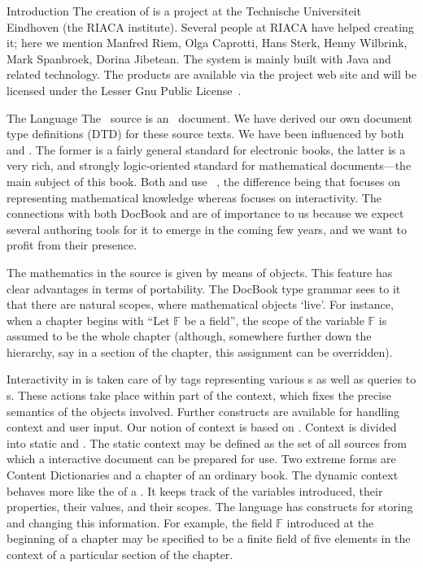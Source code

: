 \begin{omgroup}[id=mathdox2,short=MathDox,creators={amc,cuypers,barreiro}]
\begin{omgroup}{Introduction}
The creation of {\MathDox} is a project at the Technische Universiteit Eindhoven (the
RIACA institute).  Several people at RIACA have helped creating it; here we mention
Manfred Riem, Olga Caprotti, Hans Sterk, Henny Wilbrink, Mark Spanbroek, Dorina Jibetean.
The system is mainly built with Java and related technology.  The products are available
via the project web site and will be licensed under the Lesser Gnu Public
License~\cite{LGPL}.
\end{omgroup}

\begin{omgroup}[id=mathdox.ui]{The Language}
The \MathDox\ source is an \xml\ document.  We have derived our own document type
definitions (DTD) for these source texts.  We have been influenced by both
{\docbook}~\cite{WalMue:dtdg99} and {\omdoc}. The former is a fairly general standard for
electronic books, the latter is a very rich, and strongly logic-oriented standard for
mathematical documents---the main subject of this book.  Both {\omdoc} and {\MathDox} use
{\openmath}~\cite{BusCapCar:2oms04}, the difference being that {\omdoc} focuses on
representing mathematical knowledge whereas {\MathDox} focuses on interactivity.  The
connections with both DocBook and {\omdoc} are of importance to us because we expect
several authoring tools for it to emerge in the coming few years, and we want to profit
from their presence.

The mathematics in the {\MathDox} source is given by means of {\openmath} objects.  This
feature has clear advantages in terms of portability. The DocBook type grammar sees to it
that there are natural scopes, where mathematical objects `live'. For instance, when a
chapter begins with ``Let $\mathbb{F}$ be a field'', the scope of the variable
$\mathbb{F}$ is assumed to be the whole chapter (although, somewhere further down the
hierarchy, say in a section of the chapter, this assignment can be overridden).

Interactivity in {\MathDox} is taken care of by {\xml} tags representing various
{s} as well as queries to
{s}.  These actions take place within part of
the context, which fixes the precise semantics of the objects involved.  Further
constructs are available for handling context and user input.  Our notion of context is
based on \cite{FraHes:aoidms99}. Context is divided into static and
{}. The static context may be defined as the set of all {\xml}
sources from which a interactive document can be prepared for use. Two extreme forms are
{\openmath} Content Dictionaries and a chapter of an ordinary
book.  The dynamic context behaves more like the {} of a {\CAS}.  It
keeps track of the variables introduced, their properties, their values, and their scopes.
The {\MathDox} language has constructs for storing and changing this information.  For
example, the field $\mathbb{F}$ introduced at the beginning of a chapter may be specified
to be a finite field of five elements in the context of a particular section of the
chapter.


\end{omgroup}
\end{omgroup}
